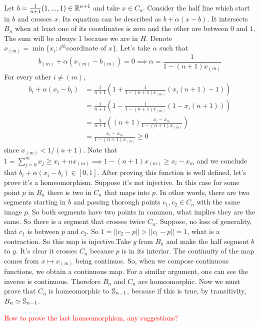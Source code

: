 Let $b = \frac{1}{n+1}(1,...,1) \in \mathbb{R}^{n+1}$ and take $x \in C_n$. Consider
the half line which start in $b$ and crosses $x$. Its equation can be
described as $b + \alpha(x - b)$. It intersects $B_n$ when at least one of its
coordinates is zero and the other are between $0$ and $1$. The sum will be
always 1 because we are in $H$. Denote $x_{(m)} = \min\{x_i : i^{th}
\text{coordinate of } x\}$. Let's take $\alpha$ such that 
$$
b_{(m)} + \alpha(x_{(m)} - b_{(m)}) = 0 \implies \alpha = \frac{1}{1 - (n+1)x_{(m)}}
$$
For every other $i \neq (m)$, 
\begin{equation*}
    \begin{split}
        b_i + \alpha(x_i - b_i) &= \frac{1}{n+1}\left(1 + \frac{1}{1 - (n+1)x_{(m)}}(x_i(n+1) - 1)\right) \\
        &= \frac{1}{n+1}\left(1 - \frac{1}{1 - (n+1)x_{(m)}}(1 - x_i(n+1))\right) \\
        &= \frac{1}{n+1}\left((n+1)\frac{x_i - x_{m}}{1 - (n+1)x_{(m)}}\right) \\
        &= \frac{x_i - x_{m}}{1 - (n+1)x_{(m)}} \ge 0
    \end{split}
\end{equation*}
since $x_{(m)} < 1/(n+1)$. Note that $1 = \sum_{j=0}^m x_j \ge x_i + nx_{(m)}
\implies 1 - (n+1)x_{(m)} \ge x_i - x_m$ and we conclude that $b_i +
\alpha(x_i - b_i) \in [0,1]$. After proving this function is well defined,
let's prove it's a homeomorphism. Suppose it's not injective. In this case for
some point $p$ in $B_n$ there is two in $C_n$ that maps into $p$. In other words,
there are two segments starting in $b$ and passing thorough points $c_1, c_2
\in C_n$ with the same image $p$. So both segments have two points in common,
what implies they are the same. So there is a segment that crosses twice
$C_n$. Suppose, no loss of generality, that $c_1$ is between $p$ and $c_2$. So
$1 = ||c_2 - p|| > ||c_1 - p|| = 1$, what is a contraction. So this map is
injective.Take $y$ from $B_n$ and make the half segment $b$ to $y$. It's clear
it crosses $C_n$ because $p$ is in its interior. The continuity of the map
comes from $x \mapsto x_{(m)}$ being continuos. So, when we compose continuous
functions, we obtain a continuous map. For a similar argument, one can see the
inverse is continuous. Therefore $B_n$ and $C_n$ are homeomorphic. Now we must
prove that $C_n$ is homeomorphic to $\mathbb{S}_{n-1}$, because if this is true,
by transitivity, $B_n \simeq \mathbb{S}_{n-1}$. 

\textcolor{red}{How to prove the last homeomorphism, any suggestions?}



